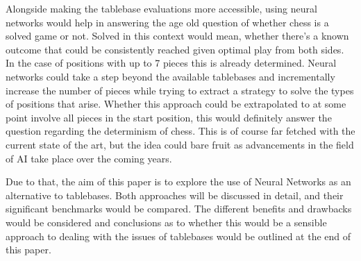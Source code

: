 Alongside making the tablebase evaluations more accessible, using neural networks would help in answering the age old question of whether chess is a solved game or not. Solved in this context would mean, whether there's a known outcome that could be consistently reached given optimal play from both sides. In the case of positions with up to 7 pieces this is already determined. Neural networks could take a step beyond the available tablebases and incrementally increase the number of pieces while trying to extract a strategy to solve the types of positions that arise. Whether this approach could be extrapolated to at some point involve all pieces in the start position, this would definitely answer the question regarding the determinism of chess. This is of course far fetched with the current state of the art, but the idea could bare fruit as advancements in the field of AI take place over the coming years.

Due to that, the aim of this paper is to explore the use of Neural Networks as an alternative to tablebases. Both approaches will be discussed in detail, and their significant benchmarks would be compared. The different benefits and drawbacks would be considered and conclusions as to whether this would be a sensible approach to dealing with the issues of tablebases would be outlined at the end of this paper.
